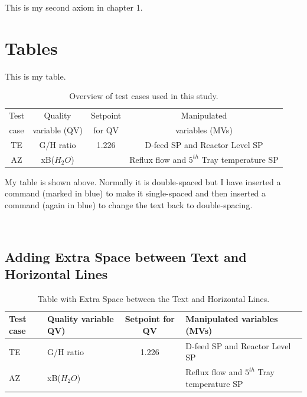 \begin{axiom}
This is my second axiom in chapter 1.
\end{axiom}

\section{Tables}

This is my table.

\renewcommand{\baselinestretch}{1}
\small\normalsize

\begin{table}[h]
\caption[Short title]{Overview of test cases used in this study.}
\begin{center}
\begin{tabular}{|c|c|c|c|}
\hline
Test & Quality & Setpoint & Manipulated \\
case & variable (QV) & for QV & variables (MVs)\\
\hline \hline
TE & G/H ratio & 1.226 & D-feed SP and Reactor Level SP\\
AZ & xB($H_2O$) & & Reflux flow and $5^{th}$ Tray temperature SP\\
\hline
\end{tabular}
\end{center}
\label{test_over}
\end{table}

\renewcommand{\baselinestretch}{2}
\small\normalsize

My table is shown above.   Normally it is double-spaced but I have inserted a command (marked in blue) to make it single-spaced and then inserted a command (again in blue) to change the text back to double-spacing.

\

\subsection{Adding Extra Space between Text and Horizontal Lines}

\renewcommand{\baselinestretch}{1}
\small\normalsize

\setlength{\tablinesep}{5ex}

\begin{table}[h]
\caption{Table with Extra Space between the Text and Horizontal Lines.}
\begin{center}
\begin{tabular}{|p{.5in}|p{1in}|c|p{2.25in}|}
\hline
Test case& Quality variable QV)& Setpoint for QV & Manipulated  variables (MVs)\\
\hline \hline
TE & G/H ratio & 1.226 & D-feed SP and Reactor Level SP\\ \hline
AZ & xB($H_2O$) & & Reflux flow and $5^{th}$ Tray temperature SP \\
\hline
\end{tabular}
\end{center}
\label{test_over}
\end{table}

